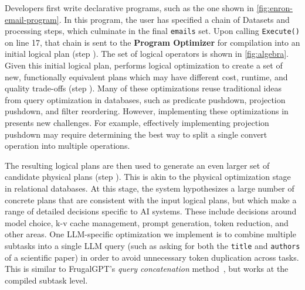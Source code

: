 Developers first write declarative programs, such as the one shown in \autoref{fig:enron-email-program}. In this program, the user has specified a chain of Datasets and processing steps, which culminate in the final {\tt emails} set. Upon calling {\tt Execute()} on line 17, that chain is sent to the {\bf Program Optimizer} for compilation into an initial logical plan (step ). The set of logical operators is shown in \autoref{fig:algebra}. Given this initial logical plan, \system{} performs logical optimization to create a set of new, functionally equivalent plans which may have different cost, runtime, and quality trade-offs (step ). Many of these optimizations reuse traditional ideas from query optimization in databases, such as predicate pushdown, projection pushdown, and filter reordering. However, implementing these optimizations in \system{} presents new challenges. For example, effectively implementing projection pushdown may require determining the best way to split a single convert operation into multiple operations. %

The resulting logical plans are then used to generate an even larger set of candidate physical plans (step ). This is akin to the physical optimization stage in relational databases. At this stage, the system hypothesizes a large number of concrete plans that are consistent with the input logical plans, but which make a range of detailed decisions specific to AI systems. These include decisions around model choice, k-v cache management, prompt generation, token reduction, and other areas. One LLM-specific optimization we implement is to combine multiple subtasks into a single LLM query (such as asking for both the {\tt title} and {\tt authors} of a scientific paper) in order to avoid unnecessary token duplication across tasks. This is similar to FrugalGPT's {\em query concatenation} method~\cite{chen2023frugalgpt}, but works at the compiled subtask level.

